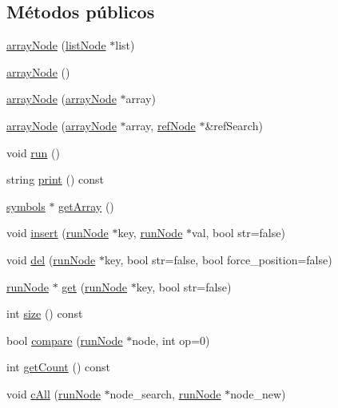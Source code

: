\subsection*{Métodos públicos}
\begin{DoxyCompactItemize}
\item 
\hyperlink{classarrayNode_aec5963f3935e85c4a08705ec96ee4a4e}{array\-Node} (\hyperlink{classlistNode}{list\-Node} $\ast$list)
\item 
\hyperlink{classarrayNode_a088c20eb41de79e7f787e8a965e1f3f1}{array\-Node} ()
\item 
\hyperlink{classarrayNode_aecbe93c9bc3651585e1cf8951cae40ed}{array\-Node} (\hyperlink{classarrayNode}{array\-Node} $\ast$array)
\item 
\hyperlink{classarrayNode_afbaaec4d754c215fbb8513170d0e282a}{array\-Node} (\hyperlink{classarrayNode}{array\-Node} $\ast$array, \hyperlink{classrefNode}{ref\-Node} $\ast$\&ref\-Search)
\item 
void \hyperlink{classarrayNode_a5ead9863a0f9478798c7777a0c03b1a5}{run} ()
\item 
string \hyperlink{classarrayNode_a7d68669075eec824abc4400f18670075}{print} () const 
\item 
\hyperlink{classsymbolsTable}{symbols} $\ast$ \hyperlink{classarrayNode_a95eea3900dfa813fba8f25dba0f8456c}{get\-Array} ()
\item 
void \hyperlink{classarrayNode_a2ccdc9126f6e778d5623b4e3a6539d19}{insert} (\hyperlink{classrunNode}{run\-Node} $\ast$key, \hyperlink{classrunNode}{run\-Node} $\ast$val, bool str=false)
\item 
void \hyperlink{classarrayNode_a15ff4fc8cc43321084be7c38f9e9ae43}{del} (\hyperlink{classrunNode}{run\-Node} $\ast$key, bool str=false, bool force\-\_\-position=false)
\item 
\hyperlink{classrunNode}{run\-Node} $\ast$ \hyperlink{classarrayNode_ac45e2ad7a922801ac99e4650d2351c96}{get} (\hyperlink{classrunNode}{run\-Node} $\ast$key, bool str=false)
\item 
int \hyperlink{classarrayNode_a0fc0d195f693f8ec2884726eec7211cf}{size} () const 
\item 
bool \hyperlink{classarrayNode_a7d5003af8f4e70e65c5b8ca7cdd5a842}{compare} (\hyperlink{classrunNode}{run\-Node} $\ast$node, int op=0)
\item 
int \hyperlink{classarrayNode_a507607cad03ce0c2d0e1de5f80b71362}{get\-Count} () const 
\item 
void \hyperlink{classarrayNode_a38fced3677c6aced8b37cc9510711970}{c\-All} (\hyperlink{classrunNode}{run\-Node} $\ast$node\-\_\-search, \hyperlink{classrunNode}{run\-Node} $\ast$node\-\_\-new)

\end{DoxyCompactItemize}
